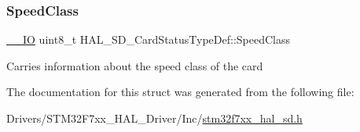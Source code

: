 \subsubsection{\texorpdfstring{SpeedClass}{SpeedClass}}
{\footnotesize\ttfamily \mbox{\hyperlink{core__sc300_8h_aec43007d9998a0a0e01faede4133d6be}{\+\_\+\+\_\+\+IO}} uint8\+\_\+t H\+A\+L\+\_\+\+S\+D\+\_\+\+Card\+Status\+Type\+Def\+::\+Speed\+Class}

Carries information about the speed class of the card 

The documentation for this struct was generated from the following file\+:\begin{DoxyCompactItemize}
\item 
Drivers/\+S\+T\+M32\+F7xx\+\_\+\+H\+A\+L\+\_\+\+Driver/\+Inc/\mbox{\hyperlink{stm32f7xx__hal__sd_8h}{stm32f7xx\+\_\+hal\+\_\+sd.\+h}}\end{DoxyCompactItemize}

